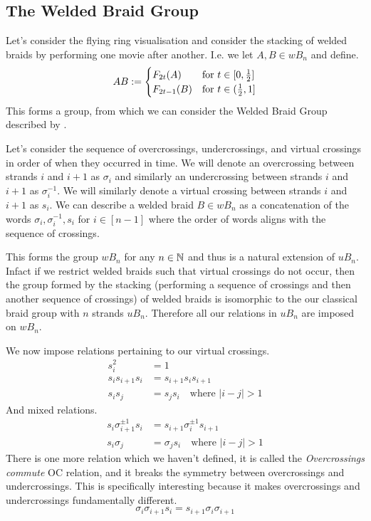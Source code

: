 \subsection{The Welded Braid Group} \label{sec:w_group}

Let's consider the flying ring visualisation and consider the stacking of welded braids by performing one movie after another. 
I.e. we let \( A, B \in wB_n \) and define.
\[
AB := 
\begin{cases}
F_{2t}(A) &\text{for \( t \in [0, \frac{1}{2}] \)} \\
F_{2t - 1}(B) &\text{for \( t \in (\frac{1}{2}, 1]\)}
\end{cases}
\]
This forms a group, from which we can consider the Welded Braid Group described by \cite{Bar_Natan_2016}.

Let's consider the sequence of overcrossings, undercrossings, and virtual crossings in order of when they occurred in time. 
We will denote an overcrossing between strands \( i \) and \( i + 1 \) as \( \sigma_i \) and similarly an undercrossing between strands \( i \) and \( i + 1 \) as \( \sigma_i^{-1} \).
We will similarly denote a virtual crossing between strands \( i \) and \( i + 1 \) as \( s_i \). 
We can describe a welded braid \( B \in wB_n \) as a concatenation of the words \( \sigma_i, \sigma_i^{-1}, s_i \) for \( i \in [n - 1] \) where the order of words aligns with the sequence of crossings. 

This forms the group \( wB_n \) for any \( n \in \mathbb{N} \) and thus is a natural extension of \( uB_n \). 
Infact if we restrict welded braids such that virtual crossings do not occur, then the group formed by the stacking (performing a sequence of crossings and then another sequence of crossings) of welded braids is isomorphic to the our classical braid group with \( n \) strands \( uB_n \).
Therefore all our relations in \( uB_n \) are imposed on \( wB_n \).

We now impose relations pertaining to our virtual crossings.
\begin{align}
    s_i^2 &= 1 \label{eq:double_virtual_crossings} \\
    s_is_{i + 1}s_i &= s_{i + 1}s_i s_{i + 1} \\
    s_i s_j &= s_j s_i \quad \text{where } |i - j| > 1
\end{align}
And mixed relations.
\begin{align}
    s_i \sigma^{\pm 1}_{i + 1} s_i &= s_{i + 1} \sigma^{\pm 1}_{i} s_{i + 1} \\
    s_i \sigma_j &= \sigma_j s_i \quad \text{where } |i - j| > 1
\end{align}
There is one more relation which we haven't defined, it is called the \textit{Overcrossings commute} OC relation, and it breaks the symmetry between overcrossings and undercrossings. 
This is specifically interesting because it makes overcrossings and undercrossings fundamentally different.
\begin{equation}
    \sigma_i \sigma_{i + 1} s_i = s_{i + 1} \sigma_i \sigma_{i + 1} \label{eq:OC}
\end{equation}

